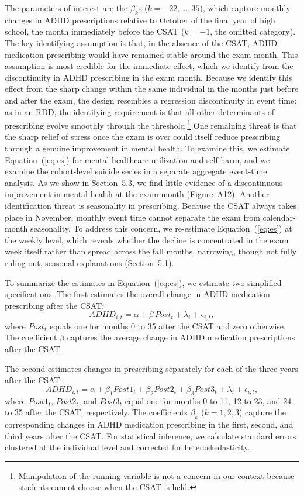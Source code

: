 \documentclass[12pt]{article}
\begin{document}
The parameters of interest are the $\beta_k$s ($k=-22,\ldots,35$), which capture monthly changes in ADHD prescriptions relative to October of the final year of high school, the month immediately before the CSAT ($k=-1$, the omitted category). The key identifying assumption is that, in the absence of the CSAT, ADHD medication prescribing would have remained stable around the exam month. This assumption is most credible for the immediate effect, which we identify from the discontinuity in ADHD prescribing in the exam month. Because we identify this effect from the sharp change within the same individual in the months just before and after the exam, the design resembles a regression discontinuity in event time: as in an RDD, the identifying requirement is that all other determinants of prescribing evolve smoothly through the threshold.\footnote{Manipulation of the running variable is not a concern in our context because students cannot choose when the CSAT is held.} One remaining threat is that the sharp relief of stress once the exam is over could itself reduce prescribing through a genuine improvement in mental health. To examine this, we estimate Equation~(\ref{eq:es}) for mental healthcare utilization and self-harm, and we examine the cohort-level suicide series in a separate aggregate event-time analysis. As we show in Section~5.3, we find little evidence of a discontinuous improvement in mental health at the exam month (Figure~A12). Another identification threat is seasonality in prescribing. Because the CSAT always takes place in November, monthly event time cannot separate the exam from calendar-month seasonality. To address this concern, we re-estimate Equation~(\ref{eq:es}) at the weekly level, which reveals whether the decline is concentrated in the exam week itself rather than spread across the fall months, narrowing, though not fully ruling out, seasonal explanations (Section~5.1).

To summarize the estimates in Equation~(\ref{eq:es}), we estimate two simplified specifications. The first estimates the overall change in ADHD medication prescribing after the CSAT:
\begin{equation}
  ADHD_{i,t} = \alpha + \beta\, Post_t + \lambda_i + \epsilon_{i,t},
  \label{eq:post}
\end{equation}
where $Post_t$ equals one for months 0 to 35 after the CSAT and zero otherwise. The coefficient $\beta$ captures the average change in ADHD medication prescriptions after the CSAT.

The second estimates changes in prescribing separately for each of the three years after the CSAT:
\begin{equation}
  ADHD_{i,t} = \alpha + \beta_1 Post1_t + \beta_2 Post2_t + \beta_3 Post3_t + \lambda_i + \epsilon_{i,t},
  \label{eq:post3}
\end{equation}
where $Post1_t$, $Post2_t$, and $Post3_t$ equal one for months 0 to 11, 12 to 23, and 24 to 35 after the CSAT, respectively. The coefficients $\beta_k$ ($k=1,2,3$) capture the corresponding changes in ADHD medication prescribing in the first, second, and third years after the CSAT. For statistical inference, we calculate standard errors clustered at the individual level and corrected for heteroskedasticity.
\end{document}
